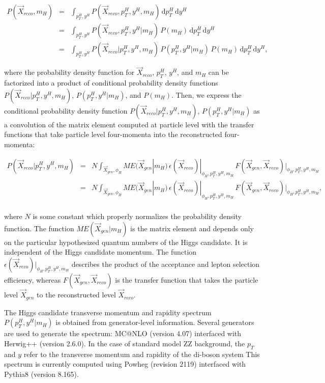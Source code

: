 \documentclass{cmspaper}
\begin{document}
\begin{eqnarray}
\label{eqn:PDF}
P(\vec{X}_{reco}, m_H) &=& \int_{p_T^H,y^H} P(\vec{X}_{reco}, p_T^H, y^H, m_H)\, \mathrm{d}p_{T}^{H}\, \mathrm{d}y^{H}  \nonumber\\
   &=& \int_{p_T^H,y^H} P(\vec{X}_{reco}, p_T^H, y^H | m_H) \, P(m_H)\, \mathrm{d}p_{T}^{H}\, \mathrm{d}y^{H} \nonumber\\
   &=& \int_{p_T^H,y^H} P(\vec{X}_{reco} | p_T^H, y^H, m_H) \, P(p_T^H, y^H | m_H) \, P(m_H)\, \mathrm{d}p_{T}^{H}\, \mathrm{d}y^{H},
\end{eqnarray} 

where the probability density function for $\vec{X}_{reco}$, $p_T^H$, $y^H$, and $m_H$ can be factorized into a
product of conditional probability density functions $P(\vec{X}_{reco} | p_T^H, y^H, m_H)$, $P(p_T^H, y^H | m_H)$, and $P(m_H)$.
Then, we express the conditional probability density function $P(\vec{X}_{reco} | p_T^H, y^H, m_H)$, $P(p_T^H, y^H | m_H)$
as a convolution of the matrix element computed at particle level with the transfer functions that take particle level
four-momenta into the reconstructed four-momenta:

\begin{eqnarray}
\label{eqn:CondPDF}
P(\vec{X}_{reco} | p_T^H, y^H, m_H) &=& N \int_{\vec{X}_{gen}, \phi_{H}} ME(\vec{X}_{gen} | m_H)
      \, \epsilon(\vec{X}_{reco})|_{\phi_H,p_T^H, y^H, m_H} \, F(\vec{X}_{gen}, \vec{X}_{reco})|_{\phi_H,p_T^H, y^H, m_H} \nonumber\\
 &=& N \int_{\vec{X}_{gen}, \phi_{H}} ME(\vec{X}_{gen} | m_H)
      \, \epsilon(\vec{X}_{reco})|_{\phi_H,p_T^H, y^H, m_H} \, F(\vec{X}_{gen}, \vec{X}_{reco})|_{\phi_H,p_T^H, y^H, m_H}, \nonumber\\
\end{eqnarray} 

where $N$ is some constant which properly normalizes the probability density function.
The function $ME(\vec{X}_{gen} | m_H)$ is the matrix element and depends only on the particular hypothesized quantum numbers 
of the Higgs candidate. It is independent of the Higgs candidate momentum. The function $\epsilon(\vec{X}_{reco})|_{\phi_H,p_T^H, y^H, m_H}$
describes the product of the acceptance and lepton selection efficiency, whereas $F(\vec{X}_{gen}, \vec{X}_{reco})$
is the transfer function that takes the particle level $\vec{X}_{gen}$ to the reconstructed level $\vec{X}_{reco}$.


The Higgs candidate transverse momentum and rapidity spectrum $P(p_T^H, y^H | m_H)$ is obtained 
from generator-level information.  Several generators are used to generate the spectrum: 
MC@NLO (version 4.07) interfaced with {\sc Herwig++} (version 2.6.0).
In the case of standard model ZZ background, the $p_T$ and $y$ refer to the 
transverse momentum and rapidity of the di-boson system
This spectrum is currently computed using {\sc Powheg} (revision 2119)
interfaced with {\sc Pythia8} (version 8.165). %
\end{document}
